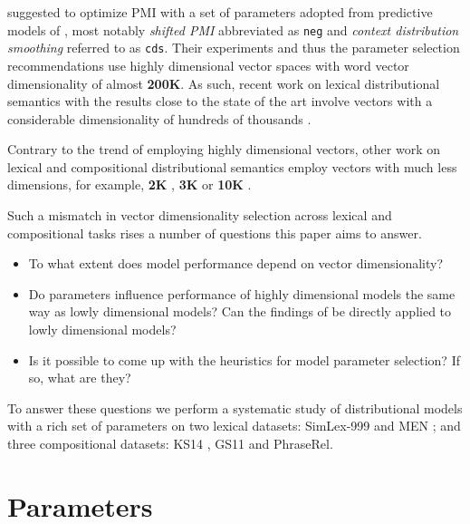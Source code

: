 \documentclass[11pt,letterpaper]{article}
\begin{document}
 suggested to optimize PMI with a  set of parameters adopted from predictive models of , most notably \emph{shifted PMI} abbreviated as \texttt{neg} and \emph{context distribution smoothing} referred to as \texttt{cds}. Their experiments and thus the parameter selection recommendations use highly dimensional vector spaces with word vector  dimensionality of almost \textbf{200K}. As such, recent work on lexical distributional semantics with the results close to the state of the art involve vectors with a considerable dimensionality of hundreds of thousands \cite{baroni-dinu-kruszewski:2014:P14-1,kiela-clark:2014:CVSC}.

Contrary to the trend of employing highly dimensional vectors, other work on lexical and compositional distributional semantics employ vectors with much less dimensions, for example, \textbf{2K} \cite{Grefenstette:2011:ESC:2145432.2145580,kartsadrqpl2014,milajevs-EtAl:2014:EMNLP2014}, \textbf{3K} \cite{Dinu:2010:MDS:1870658.1870771,milajevs-purver:2014:CVSC} or \textbf{10K} \cite{polajnar-clark:2014:EACL,Baroni2010nouns}.

Such a mismatch in vector dimensionality selection across lexical and compositional tasks rises a number of questions this paper aims to answer.
\begin{itemize}
\item To what extent does model performance depend on vector dimensionality?
\item Do parameters influence performance of highly dimensional models the same way as lowly dimensional models? Can the findings of  be directly applied to lowly dimensional models?
\item Is it possible to come up with the heuristics for model parameter selection? If so, what are they?
\end{itemize}

To answer these questions we perform a systematic study of distributional models with a rich set of parameters on two lexical datasets: SimLex-999 \cite{hill2014simlex} and MEN \cite{Bruni:2014:MDS:2655713.2655714}; and three compositional datasets: KS14 \cite{kartsadrqpl2014}, GS11 \cite{Grefenstette:2011:ESC:2145432.2145580} and PhraseRel.

\section{Parameters}
\label{sec:parameters}
\end{document}
